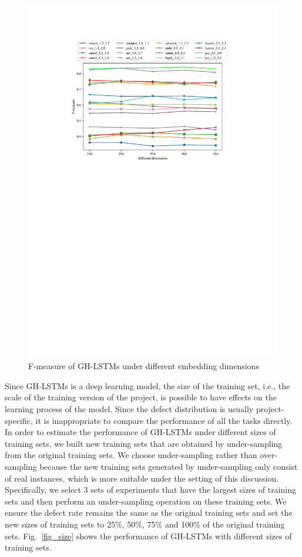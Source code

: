 \documentclass[journal]{IEEEtran}
\begin{document}
\begin{figure}[h]
	\centering
	\includegraphics[scale=0.6]{figs/dimensions.pdf}
	\caption{F-measure of GH-LSTMs under different embedding dimensions}
	\label{fig_dimensions}
\end{figure}

Since GH-LSTMs is a deep learning model, the size of the training set, i.e., the scale of the training version of the project, is possible to have effects on the learning process of the model. Since the defect distribution is usually project-specific, it is inappropriate to compare the performance of all the tasks directly. In order to estimate the performance of GH-LSTMs under different sizes of training sets, we built new training sets that are obtained by under-sampling from the original training sets. We choose under-sampling rather than over-sampling because the new training sets generated by under-sampling only consist of real instances, which is more suitable under the setting of this discussion. Specifically, we select 3 sets of experiments that have the largest sizes of training sets and then perform an under-sampling operation on these training sets. We ensure the defect rate remains the same as the original training sets and set the new sizes of training sets to 25\%, 50\%, 75\% and 100\% of the original training sets. Fig.~\ref{fig_size} shows the performance of GH-LSTMs with different sizes of training sets.
\end{document}
